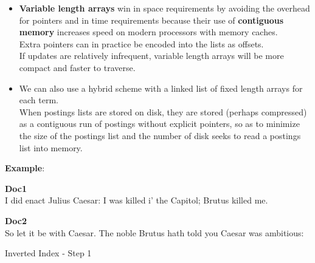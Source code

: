 \begin{itemize}
\begin{itemize}
        \item \textbf{Variable length arrays} win in space requirements by avoiding the overhead for pointers and in time requirements because their use of \textbf{contiguous memory} increases speed on modern processors with memory caches.\\
        Extra pointers can in practice be encoded into the lists as offsets.\\
        If updates are relatively infrequent, variable length arrays will be more compact and faster to traverse.

        \item We can also use a hybrid scheme with a linked list of fixed length arrays for each term.\\
        When postings lists are stored on disk, they are stored (perhaps compressed) as a contiguous run of postings without explicit pointers, so as to minimize the size of the postings list and the number of disk seeks to read a postings list into memory.
    \end{itemize}

    
\end{itemize}

\noindent \textbf{Example}:
\begin{table}[h]
    \begin{minipage}[t]{.45\linewidth}
        \textbf{Doc1}\\
        I did enact Julius Caesar: I was killed i’ the Capitol; Brutus killed me.
    \end{minipage}
    \hfill
    \begin{minipage}[t]{.45\linewidth}
        \textbf{Doc2}\\
        So let it be with Caesar. The noble Brutus hath told you Caesar was ambitious:
    \end{minipage}
    \caption{Inverted Index - Step 1}
\end{table}

